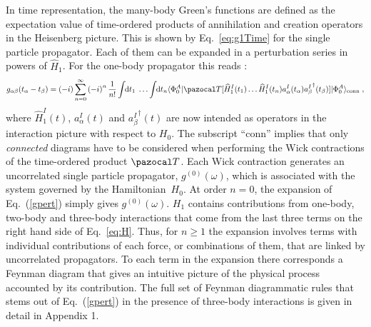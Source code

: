 In time representation, the many-body Green's functions are defined as the expectation value of  time-ordered products of  annihilation and creation operators  in the Heisenberg picture. This is shown by Eq.~\eqref{eq:g1Time} for the single particle propagator.
Each of them can be expanded in a perturbation series in powers of $\widehat{H}_1$.
For the one-body propagator this  reads \cite{ch11_Mattuck1992,ch11_Dickhoff2008}:
\begin{equation}
\label{gpert}
g_{\alpha\beta}(t_\alpha-t_\beta) = (- i) \sum_{n=0}^\infty \left(-  i\right)^n\frac{1}{n!}\int \hspace{-1mm} {\rm d} t_1 \; \ldots \int \hspace{-1mm} {\rm d} t_n \langle\Phi_0^A\vert {\pazocal T} [\widehat H^I_1(t_1) \ldots \widehat H^I_1(t_n)a^I_\alpha(t_\alpha){a_{\beta}^I}^\dag(t_\beta)]\vert\Phi_0^A\rangle_\text{conn} \; ,
\end{equation}
where $\widehat H^I_1(t)$, $a^I_\alpha(t)$ and ${a_{\beta}^I}^\dag(t)$ are now intended as operators in the interaction picture with respect to $H_0$. 
The subscript ``conn'' implies that only \emph{connected} diagrams have to be considered when performing
the Wick contractions of the time-ordered product ${\pazocal T}$.  Each Wick contraction generates an uncorrelated single particle propagator, $g^{(0)}(\omega)$,  which is associated with the system governed by the Hamiltonian~$H_0$.
At order $n=0$, the expansion of Eq.~(\ref{gpert}) simply gives $g^{(0)}(\omega)$.
$H_1$ contains contributions from one-body, two-body and three-body interactions that come from the last three terms on the right hand side of Eq.~\eqref{eq:H}. Thus, for $n\geq1$ the expansion involves terms with individual contributions of each force, or combinations of them, that are linked by uncorrelated propagators.  To each term in the expansion there corresponds a Feynman diagram that gives an intuitive picture of the 
physical process accounted by its contribution. The full set of Feynman diagrammatic rules that stems out of Eq.~(\ref{gpert})
in the presence of three-body interactions is given in detail in Appendix 1.

